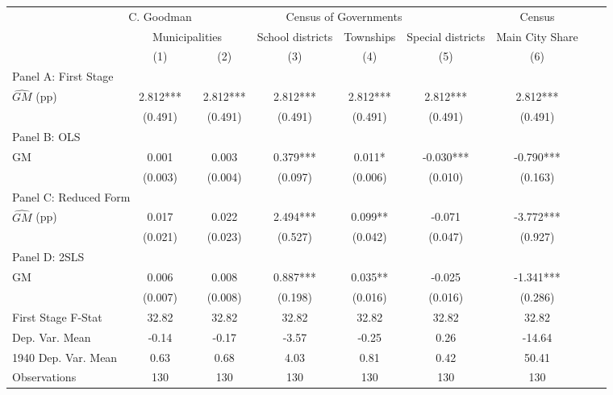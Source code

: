  \begin{tabular}{l*{8}{c}} \toprule
&\multicolumn{1}{c}{C. Goodman}&\multicolumn{4}{c}{Census of Governments}&\multicolumn{1}{c}{Census}\\\cmidrule(lr){2-2}\cmidrule(lr){3-6}\cmidrule(lr){7-7}
&\multicolumn{2}{c}{Municipalities}&\multicolumn{1}{c}{School districts}&\multicolumn{1}{c}{Townships}&\multicolumn{1}{c}{Special districts}&\multicolumn{1}{c}{Main City Share}\\\cmidrule(lr){2-3}\cmidrule(lr){4-6}\cmidrule(lr){7-7}
&\multicolumn{1}{c}{(1)}&\multicolumn{1}{c}{(2)}&\multicolumn{1}{c}{(3)}&\multicolumn{1}{c}{(4)}&\multicolumn{1}{c}{(5)}&\multicolumn{1}{c}{(6)}\\
\cmidrule(lr){1-7}
\multicolumn{6}{l}{Panel A: First Stage}\\
\cmidrule(lr){1-7}
$\widehat{GM}$ (pp)&    2.812***&    2.812***&    2.812***&    2.812***&    2.812***&    2.812***\\
                &  (0.491)   &  (0.491)   &  (0.491)   &  (0.491)   &  (0.491)   &  (0.491)   \\
\cmidrule(lr){1-7}
\multicolumn{6}{l}{Panel B: OLS}\\
\cmidrule(lr){1-7}
GM              &    0.001   &    0.003   &    0.379***&    0.011*  &   -0.030***&   -0.790***\\
                &  (0.003)   &  (0.004)   &  (0.097)   &  (0.006)   &  (0.010)   &  (0.163)   \\
\cmidrule(lr){1-7}
\multicolumn{6}{l}{Panel C: Reduced Form}\\
\cmidrule(lr){1-7}
$\widehat{GM}$ (pp)&    0.017   &    0.022   &    2.494***&    0.099** &   -0.071   &   -3.772***\\
                &  (0.021)   &  (0.023)   &  (0.527)   &  (0.042)   &  (0.047)   &  (0.927)   \\
\cmidrule(lr){1-7}
\multicolumn{6}{l}{Panel D: 2SLS}\\
\cmidrule(lr){1-7}
GM              &    0.006   &    0.008   &    0.887***&    0.035** &   -0.025   &   -1.341***\\
                &  (0.007)   &  (0.008)   &  (0.198)   &  (0.016)   &  (0.016)   &  (0.286)   \\
\midrule
First Stage F-Stat&    32.82   &    32.82   &    32.82   &    32.82   &    32.82   &    32.82   \\
Dep. Var. Mean  &    -0.14   &    -0.17   &    -3.57   &    -0.25   &     0.26   &   -14.64   \\
1940 Dep. Var. Mean&     0.63   &     0.68   &     4.03   &     0.81   &     0.42   &    50.41   \\
Observations    &      130   &      130   &      130   &      130   &      130   &      130   \\
 \bottomrule \end{tabular}
